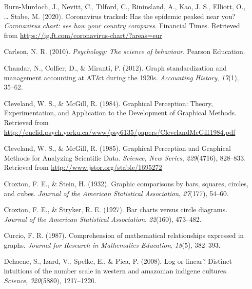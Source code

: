 \documentclass[print]{nuthesis}
\newlength{\cslhangindent}
\newenvironment{CSLReferences}%
{\setlength{\parindent}{0pt}%
\everypar{\setlength{\hangindent}{\cslhangindent}}\ignorespaces}%
{\par}
\begin{document}
\begin{CSLReferences}{1}{0}
\leavevmode{}%
Burn-Murdoch, J., Nevitt, C., Tilford, C., Rininsland, A., Kao, J. S., Elliott, O., \ldots{} Stabe, M. (2020). Coronavirus tracked: Has the epidemic peaked near you? \emph{Coronavirus chart: see how your country compares}. Financial Times. Retrieved from \url{https://ig.ft.com/coronavirus-chart/?areas=eur}

\leavevmode{}%
Carlson, N. R. (2010). \emph{Psychology: The science of behaviour}. Pearson Education.

\leavevmode{}%
Chandar, N., Collier, D., \& Miranti, P. (2012). Graph standardization and management accounting at AT\&t during the 1920s. \emph{Accounting History}, \emph{17}(1), 35--62.

\leavevmode{}%
Cleveland, W. S., \& McGill, R. (1984). Graphical {Perception}: {Theory}, {Experimentation}, and {Application} to the {Development} of {Graphical} {Methods}. Retrieved from \url{http://euclid.psych.yorku.ca/www/psy6135/papers/ClevelandMcGill1984.pdf}

\leavevmode{}%
Cleveland, W. S., \& McGill, R. (1985). Graphical {Perception} and {Graphical} {Methods} for {Analyzing} {Scientific} {Data}. \emph{Science, New Series}, \emph{229}(4716), 828--833. Retrieved from \url{http://www.jstor.org/stable/1695272}

\leavevmode{}%
Croxton, F. E., \& Stein, H. (1932). Graphic comparisons by bars, squares, circles, and cubes. \emph{Journal of the American Statistical Association}, \emph{27}(177), 54--60.

\leavevmode{}%
Croxton, F. E., \& Stryker, R. E. (1927). Bar charts versus circle diagrams. \emph{Journal of the American Statistical Association}, \emph{22}(160), 473--482.

\leavevmode{}%
Curcio, F. R. (1987). Comprehension of mathematical relationships expressed in graphs. \emph{Journal for Research in Mathematics Education}, \emph{18}(5), 382--393.

\leavevmode{}%
Dehaene, S., Izard, V., Spelke, E., \& Pica, P. (2008). Log or linear? Distinct intuitions of the number scale in western and amazonian indigene cultures. \emph{Science}, \emph{320}(5880), 1217--1220.


\end{CSLReferences}
\end{document}
